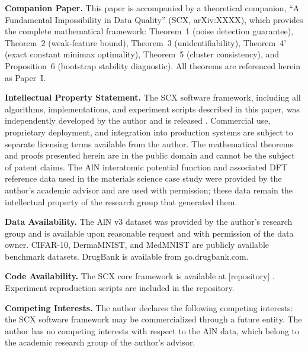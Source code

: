 \begin{flushleft}
\textbf{Companion Paper.} This paper is accompanied by a theoretical companion, ``A Fundamental Impossibility in Data Quality'' (SCX, arXiv:XXXX), which provides the complete mathematical framework: Theorem~1 (noise detection guarantee), Theorem~2 (weak-feature bound), Theorem~3 (unidentifiability), Theorem~4' (exact constant minimax optimality), Theorem~5 (cluster consistency), and Proposition~6 (bootstrap stability diagnostic). All theorems are referenced herein as Paper~I.

\end{flushleft}




\textbf{Intellectual Property Statement.}
The SCX software framework, including all algorithms, implementations, and experiment scripts described in this paper, was independently developed by the author and is released . Commercial use, proprietary deployment, and integration into production systems are subject to separate licensing terms available from the author. The mathematical theorems and proofs presented herein are in the public domain and cannot be the subject of patent claims. The AlN interatomic potential function and associated DFT reference data used in the materials science case study were provided by the author's academic advisor and are used with permission; these data remain the intellectual property of the research group that generated them.

\textbf{Data Availability.}
The AlN v3 dataset was provided by the author's research group and is available upon reasonable request and with permission of the data owner. CIFAR-10, DermaMNIST, and MedMNIST are publicly available benchmark datasets. DrugBank is available from go.drugbank.com.

\textbf{Code Availability.}
The SCX core framework is available at [repository] . Experiment reproduction scripts are included in the repository.

\textbf{Competing Interests.}
The author declares the following competing interests: the SCX software framework may be commercialized through a future entity. The author has no competing interests with respect to the AlN data, which belong to the academic research group of the author's advisor.



